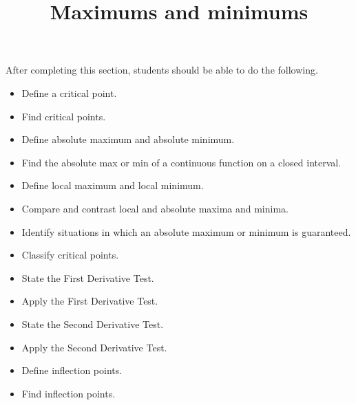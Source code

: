 \documentclass{ximera}
\title{Maximums and minimums}
\begin{document}
\begin{abstract}
\end{abstract}

\maketitle

\begin{sectionOutcomes}

After completing this section, students should be able to do the following.

\begin{itemize}
	\item Define a critical point.
	\item Find critical points.
	\item Define absolute maximum and absolute minimum.
	\item Find the absolute max or min of a continuous function on a closed interval.
	\item Define local maximum and local minimum.
	\item Compare and contrast local and absolute maxima and minima.
	\item Identify situations in which an absolute maximum or minimum is guaranteed.
	\item Classify critical points.
	\item State the First Derivative Test.
	\item Apply the First Derivative Test.
	\item State the Second Derivative Test.
	\item Apply the Second Derivative Test.
	\item Define inflection points.
	\item Find inflection points.
\end{itemize}

\end{sectionOutcomes}
\end{document}
